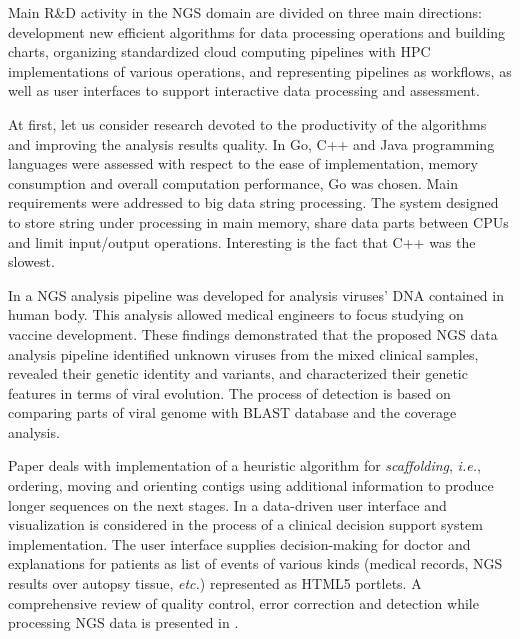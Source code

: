 \documentclass[a4paper]{jpconf}
\begin{document}
Main R\&D activity in the NGS domain are divided on three main directions: development new efficient algorithms for data processing operations and building charts, organizing standardized cloud computing pipelines with HPC implementations of various operations, and representing pipelines as workflows, as well as user interfaces to support interactive data processing and assessment.

At first, let us consider research devoted to the productivity of the algorithms and improving the analysis results quality.  In \cite{const19} Go, C++ and Java programming languages were assessed with respect to the ease of implementation, memory consumption and overall computation performance, Go was chosen. Main requirements were addressed to big data string processing. The system designed to store string under processing in main memory, share data parts between CPUs and limit input/output operations. Interesting is the fact that C++ was the slowest.

In \cite{Gong16} a NGS analysis pipeline was developed for analysis viruses' DNA contained in human body. This analysis allowed medical engineers to focus studying on vaccine development. These findings demonstrated that the proposed NGS data analysis pipeline identified unknown viruses from the mixed clinical samples, revealed their genetic identity and variants, and characterized their genetic features in terms of viral evolution. The process of detection is based on comparing parts of viral genome with BLAST database and the coverage analysis.

Paper \cite{grass12} deals with implementation of a heuristic algorithm for \emph{scaffolding}, \emph{i.e.}, ordering, moving and orienting contigs using additional information to produce longer sequences on the next stages.
In \cite{muller16} a data-driven user interface and visualization is considered in the process of a clinical decision support system implementation. The user interface supplies decision-making for doctor and explanations for patients as list of events of various kinds (medical records, NGS results over autopsy tissue, \emph{etc.}) represented as HTML5 portlets. A comprehensive review of quality control, error correction and detection while processing NGS data is presented in \cite{te16}. %
\end{document}
